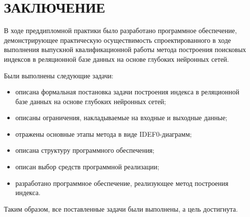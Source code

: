 \chapter*{ЗАКЛЮЧЕНИЕ}

В ходе преддипломной практики было разработано программное обеспечение,
демонстрирующее практическую осуществимость спроектированного в ходе
выполнения выпускной квалификационной работы метода построения поисковых
индексов в реляционной базе данных на основе глубоких нейронных сетей.

Были выполнены следующие задачи:

\begin{itemize}
    \item описана формальная постановка задачи построения индекса в реляционной
        базе данных на основе глубоких нейронных сетей;
    \item описаны ограничения, накладываемые на входные и выходные данные;
    \item отражены основные этапы метода в виде IDEF0-диаграмм;
    \item описана структуру программного обеспечения;
    \item описан выбор средств программной реализации;
    \item разработано программное обеспечение, реализующее метод построения
        индекса.
\end{itemize}

Таким образом, все поставленные задачи были выполнены, а цель достигнута.

